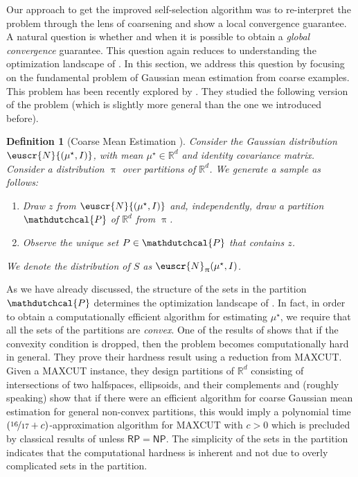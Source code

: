 \documentclass[11pt,letterpaper]{article}
\makeatletter
\theoremstyle{plain}
\newtheorem{definition}{Definition}
\theoremstyle{definition}
\theoremstyle{remark}
\renewcommand{\eqref}[1]{\textup{\eqrefform@{\ref{#1}}}}
\let\eqrefform@\tagform@
\newcommand{\sinparen}[1]{\ensuremath{(#1)}}
\newcommand{\inparen}[1]{\ensuremath{\left(#1\right)}}
\newcommand{\R}{\mathbb{R}}
\newcommand{\nfrac}[2]{\nicefrac{#1}{#2}}
\newcommand{\customcal}[1]{\euscr{#1}}
\newcommand{\cN}{\customcal{N}}
\renewcommand{\pi}{\uppi}
\newcommand{\hypo}[1]{\mathdutchcal{#1}}
\newcommand{\hyP}{\hypo{P}}
\newcommand{\normal}[2]{\cN{\inparen{#1,#2}}}
\newcommand{\maxcut}{\textsf{MAXCUT}\xspace}
\newcommand{\NP}{\ensuremath{\mathsf{NP}}\xspace}
\newcommand{\RP}{\ensuremath{\mathsf{RP}}\xspace}
\makeatother
\begin{document}
Our approach to get the improved self-selection algorithm was to re-interpret the problem through the lens of coarsening 
and show a local convergence guarantee. 
A natural question is whether and when it is possible to obtain a \emph{global convergence} guarantee. 
This question again reduces to understanding the optimization landscape of \eqref{eq:NLL-intro}. 
In this section, we address this question by focusing on the {fundamental} problem of Gaussian mean estimation from coarse examples. 
This problem has been recently explored by \citet{fotakis2021coarse}. 
They studied the following version of the problem 
(which is slightly more general than the one we introduced before).
\begin{definition}
[Coarse Mean Estimation \cite{fotakis2021coarse}]
Consider the Gaussian distribution $\normal{\mu^\star}{I}$, with mean $\mu^\star \in \R^d$ and identity covariance matrix.
Consider a distribution $\pi$ over partitions of $\R^d$.
We generate a sample as follows:
\begin{enumerate}[itemsep=1pt]
    \item Draw $z$ from $\normal{\mu^\star}{I}$ and, independently, draw a partition $\hyP$ of $\R^d$ from $\pi$.
    \item Observe the unique set $P \in \hyP$ that contains $z$.
\end{enumerate}
We denote the distribution of $S$ as $\cN_\pi(\mu^\star, I)$.
\end{definition}
As we have already discussed, the structure of the sets in the partition $\hyP$ {determines} the optimization landscape of \eqref{eq:NLL-intro}. In fact, in order to obtain a computationally efficient algorithm for estimating $\mu^\star$, we require that all the sets of the partitions are \emph{convex}. One of the results of \cite{fotakis2021coarse} shows that if the convexity condition is dropped, then the problem becomes computationally hard in general.
They prove their hardness result using a reduction from \maxcut{}. Given a \maxcut{} instance, they design
partitions of $\R^d$ consisting of intersections of two halfspaces, ellipsoids, and their complements and (roughly speaking) show that if there were an efficient algorithm for coarse Gaussian mean estimation for general non-convex partitions, this would imply a polynomial time $\sinparen{\nfrac{16}{17}+c}$-approximation algorithm for \maxcut{} with $c > 0$ which is precluded by classical results of \citet{hastad1997inapproximability} {unless $\RP=\NP$}. The simplicity of the sets in the partition indicates that the computational hardness is inherent and not due to overly complicated sets in the partition. 
\end{document}
